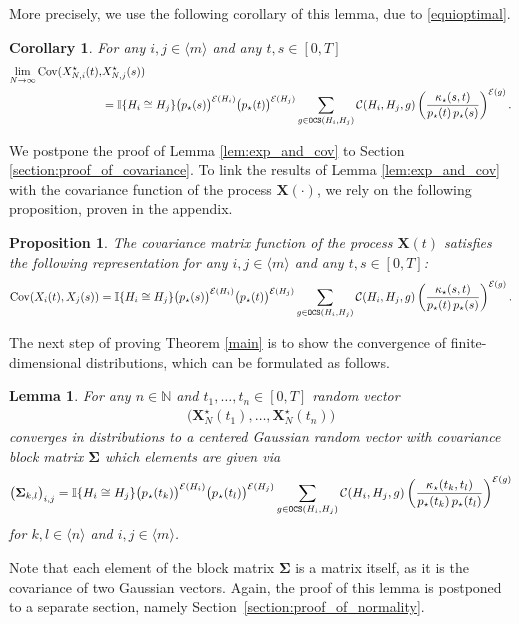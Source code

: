 \documentclass[11pt,reqno]{amsart}
\numberwithin{equation}{section}
\newcommand{\sprod}[1]{\langle#1\rangle}
\newcommand{\N}{\mathbb{N}}
\newtheorem{lem}[theo]{Lemma}
\newtheorem{korr}[theo]{Corollary}
\newtheorem{prop}[theo]{Proposition}
\newcommand{\nelem}[1]{{Lemma \ref{#1}}}
\newcommand{\netheo}[1]{{Theorem \ref{#1}}}
\newcommand{\kb}[1]{\boldsymbol{#1}}
\newcommand{\vk}[1]{\kb{#1}}
\begin{document}
More precisely, we use the following corollary of this lemma, due to \eqref{equioptimal}.

\begin{korr}\label{korr:exp_and_cov}
    For any $i,j\in\sprod{m}$ and any $t,s\in[0,T]$
    \begin{align*}
        \lim_{N\to\infty}\operatorname{Cov}(X_{N,i}^{\star}(t),&X_{N,j}^{\star}(s))\\&=\mathbb{I}\{{H}_i\cong {H}_j\}\bigl(p_{\star}(s)\bigr)^{\mathcal{E}({H}_i)}\bigl(p_{\star}(t)\bigr)^{\mathcal{E}({H}_j)} \sum_{g\in{\tt OCS}({H}_i,{H}_j)}\mathcal{C}({H}_i,{H}_j,g)\left(\frac{\kappa_{\star}(s,t)}{p_{\star}(t)\,p_{\star}(s)}\right)^{\mathcal{E}(g)}.
    \end{align*}
\end{korr}

We postpone the proof of \nelem{lem:exp_and_cov} to Section \ref{section:proof_of_covariance}. 
To link the results of \nelem{lem:exp_and_cov} with the covariance function of the process {$\vk X(\cdot)$}, we rely on the following proposition, proven in the appendix.
\begin{prop}\label{prop:X_vk_cov}
    The covariance matrix function of the process $\vk X(t)$ satisfies the following representation for any $i,j\in\sprod{m}$ and any $t,s\in[0,T]$:
    \begin{align*}
        \operatorname{Cov}(X_i(t),X_j(s)) = \mathbb{I}\{{H}_i\cong {H}_j\}\bigl(p_{\star}(s)\bigr)^{\mathcal{E}({H}_i)}\bigl(p_{\star}(t)\bigr)^{\mathcal{E}({H}_j)} \sum_{g\in{\tt OCS}({H}_i,{H}_j)}\mathcal{C}({H}_i,{H}_j,g)\left(\frac{\kappa_{\star}(s,t)}{p_{\star}(t)\,p_{\star}(s)}\right)^{\mathcal{E}(g)}.
    \end{align*}
\end{prop}


The next step of proving \netheo{main} is to show the convergence of finite-dimensional distributions, which can be formulated as follows.

\begin{lem}\label{lem:asymptotic_normality}
    For any $n\in\N$ and $t_1,\ldots,t_n\in[0,T]$ random vector
    \begin{align*}
        \bigl(\vk X^{\star}_N(t_1),\ldots, \vk X^{\star}_N(t_n)\bigr)
    \end{align*}
    converges in distributions to a centered Gaussian random vector with covariance block matrix $\vk \Sigma$ which elements are given via
    \begin{align*}
        \bigl(\vk \Sigma_{k,l}\bigr)_{i,j} =\mathbb{I}\{{H}_i\cong {H}_j\} \bigl(p_{\star}(t_{k})\bigr)^{\mathcal{E}({H}_i)}\bigl(p_{\star}(t_{l})\bigr)^{\mathcal{E}({H}_j)}\sum_{g\in{\tt OCS}({H}_i,{H}_j)}\mathcal{C}({H}_i,{H}_j,g)\left(\frac{\kappa_{\star}(t_k,t_l)}{p_{\star}(t_k)\,p_{\star}(t_l)}\right)^{\mathcal{E}(g)}
    \end{align*}
    for $k,l\in\sprod{n}$ and $i,j\in \sprod{m}$.
\end{lem}
Note that each element of the block matrix $\vk \Sigma$ is a matrix itself, as it is the covariance of two Gaussian vectors.
Again, the proof of this lemma is postponed to a separate section, namely Section~\ref{section:proof_of_normality}.
\end{document}
